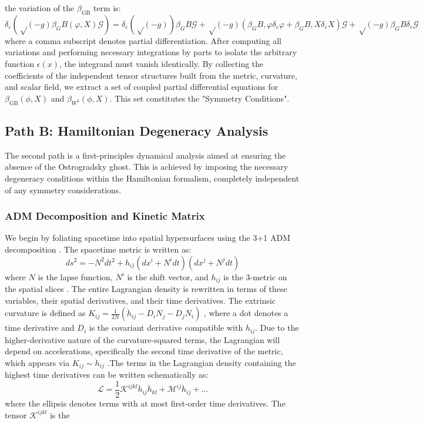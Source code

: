 \documentclass[twocolumn]{aastex631}
\begin{document}
the variation of the $\beta_{\text{GB}}$ term is:\begin{equation}δ_ε(√(-g)β_GB(φ, X)𝒢) = δ_ε(√(-g))β_GB𝒢 + √(-g)(β_GB,φδ_εφ + β_GB,Xδ_εX)𝒢 + √(-g)β_GBδ_ε𝒢\end{equation}where a comma subscript denotes partial differentiation. After computing all variations and performing necessary integrations by parts to isolate the arbitrary function $\epsilon(x)$, the integrand must vanish identically. By collecting the coefficients of the independent tensor structures built from the metric, curvature, and scalar field, we extract a set of coupled partial differential equations for $\beta_{\text{GB}}(\phi, X)$ and $\beta_{W^2}(\phi, X)$. This set constitutes the "Symmetry Conditions".\subsection{Path B: Hamiltonian Degeneracy Analysis}The second path is a first-principles dynamical analysis aimed at ensuring the absence of the Ostrogradsky ghost. This is achieved by imposing the necessary degeneracy conditions within the Hamiltonian formalism, completely independent of any symmetry considerations. \citep{motohashi2016healthydegeneratetheorieshigher,svanberg2022theorieshigherordertimederivatives}\subsubsection{ADM Decomposition and Kinetic Matrix}We begin by foliating spacetime into spatial hypersurfaces using the 3+1 ADM decomposition \citep{gourgoulhon200731formalismbasesnumerical,corichi2023introductionadmformalism}. The spacetime metric is written as: \citep{corichi2023introductionadmformalism}\begin{equation}ds^2 = -N^2 dt^2 + h_{ij}(dx^i + N^i dt)(dx^j + N^j dt)\end{equation}where $N$ is the lapse function, $N^i$ is the shift vector, and $h_{ij}$ is the 3-metric on the spatial slices \citep{brewin1997adm31formulationsmooth,bajardi2024primaryconstraintsgeneralteleparallel,vinckers2024numericalsolutionsfrkleingordon}. The entire Lagrangian density is rewritten in terms of these variables, their spatial derivatives, and their time derivatives. The extrinsic curvature is defined as $K_{ij} = \frac{1}{2N}(\dot{h}_{ij} - D_i N_j - D_j N_i)$ \citep{vinckers2024numericalsolutionsfrkleingordon}, where a dot denotes a time derivative and $D_i$ is the covariant derivative compatible with $h_{ij}$. Due to the higher-derivative nature of the curvature-squared terms, the Lagrangian will depend on accelerations, specifically the second time derivative of the metric, which appears via $\dot{K}_{ij} \sim \ddot{h}_{ij}$ \citep{brown2011generalizedharmonicequations31}.The terms in the Lagrangian density containing the highest time derivatives can be written schematically as:\begin{equation}\mathcal{L} = \frac{1}{2} \mathcal{K}^{ijkl} \ddot{h}_{ij} \ddot{h}_{kl} + \mathcal{M}^{ij} \ddot{h}_{ij} + \dots\end{equation}where the ellipsis denotes terms with at most first-order time derivatives. The tensor $\mathcal{K}^{ijkl}$ is the 
\end{document}
